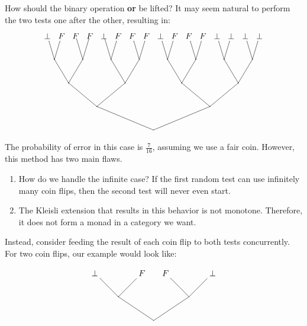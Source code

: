 How should the binary operation \textbf{or} be lifted?  It may seem natural to perform the two tests one after the other, resulting in:
\[
\begin{xy}
(45,0)*{} = "v1";%
(21,10)*{} = "v2";%
(69,10)*{} = "v3";%
(9,20)*{} = "v4";%
(33,20)*{} = "v5";%
(57,20)*{} = "v6";%
(81,20)*{} = "v7";%
(3,30)*{} = "v8";%
(15,30)*{} = "v9";%
(27,30)*{} = "v10";%
(39,30)*{} = "v11";%
(51,30)*{} = "v12";%
(63,30)*{} = "v13";%
(75,30)*{} = "v14";%
(87,30)*{} = "v15";%
(0,40)*+{\bot} = "v16";%
(6,40)*+{F} = "v17";%
(12,40)*{F} = "v18";%
(18,40)*{F} = "v19";%
(24,40)*{\bot} = "v20";%
(30,40)*+{F} = "v21";%
(36,40)*+{F} = "v22";%
(42,40)*+{F} = "v23";%
(48,40)*+{\bot} = "v24";%
(54,40)*+{F} = "v25";%
(60,40)*+{F} = "v26";%
(66,40)*+{F} = "v27";%
(72,40)*+{\bot} = "v28";%
(78,40)*+{\bot} = "v29";%
(84,40)*+{\bot} = "v30";%
(90,40)*+{\bot} = "v31";%
{\ar@{-} "v1"; "v2"};%
{\ar@{-} "v1"; "v3"};%
{\ar@{-} "v2"; "v4"};%
{\ar@{-} "v2"; "v5"};%
{\ar@{-} "v3"; "v6"};%
{\ar@{-} "v3"; "v7"};%
{\ar@{-} "v4"; "v8"};%
{\ar@{-} "v4"; "v9"};%
{\ar@{-} "v5"; "v10"};%
{\ar@{-} "v5"; "v11"};%
{\ar@{-} "v6"; "v12"};%
{\ar@{-} "v6"; "v13"};%
{\ar@{-} "v7"; "v14"};%
{\ar@{-} "v7"; "v15"};%
{\ar@{-} "v8"; "v16"};%
{\ar@{-} "v8"; "v17"};%
{\ar@{-} "v9"; "v18"};%
{\ar@{-} "v9"; "v19"};%
{\ar@{-} "v10"; "v20"};%
{\ar@{-} "v10"; "v21"};%
{\ar@{-} "v11"; "v22"};%
{\ar@{-} "v11"; "v23"};%
{\ar@{-} "v12"; "v24"};%
{\ar@{-} "v12"; "v25"};%
{\ar@{-} "v13"; "v26"};%
{\ar@{-} "v13"; "v27"};%
{\ar@{-} "v14"; "v28"};%
{\ar@{-} "v14"; "v29"};%
{\ar@{-} "v15"; "v30"};%
{\ar@{-} "v15"; "v31"};
\end{xy}
\]

The probability of error in this case is $\frac{7}{16}$, assuming we use a fair coin.  However, this method has two main flaws.
\begin{enumerate}
\item How do we handle the infinite case?  If the first random test can use infinitely many coin flips, then the second test will never even start.
\item The Kleisli extension that results in this behavior is not monotone.  Therefore, it does not form a monad in a category we want.
\end{enumerate}

Instead, consider feeding the result of each coin flip to both tests concurrently.  For two coin flips, our example would look like:

\[
\begin{xy}
(0,20)*+{\bot} = "v4";%
(20,20)*+{F} = "v5";%
(30,20)*+{F} = "v6";%
(50,20)*+{\bot} = "v7";%
(10,10)*{} = "v8";%
(40,10)*{} = "v9";%
(25,0)*{} = "v10";%
{\ar@{-} "v9"; "v6"};%
{\ar@{-} "v9"; "v7"};%
{\ar@{-} "v8"; "v5"};%
{\ar@{-} "v8"; "v4"};%
{\ar@{-} "v10"; "v8"};%
{\ar@{-} "v10"; "v9"};
\end{xy}
\]


